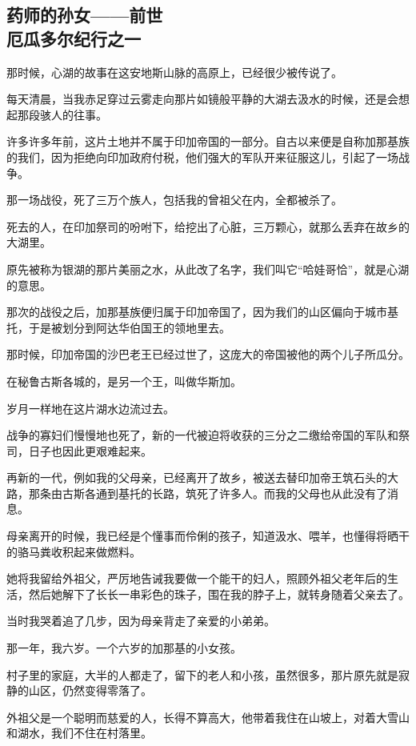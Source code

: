 \subsection{药师的孙女——前世\\\small{厄瓜多尔纪行之一}}
\par 那时候，心湖的故事在这安地斯山脉的高原上，已经很少被传说了。
\par 每天清晨，当我赤足穿过云雾走向那片如镜般平静的大湖去汲水的时候，还是会想起那段骇人的往事。
\par 许多许多年前，这片土地并不属于印加帝国的一部分。自古以来便是自称加那基族的我们，因为拒绝向印加政府付税，他们强大的军队开来征服这儿，引起了一场战争。
\par 那一场战役，死了三万个族人，包括我的曾祖父在内，全都被杀了。
\par 死去的人，在印加祭司的吩咐下，给挖出了心脏，三万颗心，就那么丢弃在故乡的大湖里。
\par 原先被称为银湖的那片美丽之水，从此改了名字，我们叫它“哈娃哥恰”，就是心湖的意思。
\par 那次的战役之后，加那基族便归属于印加帝国了，因为我们的山区偏向于城市基托，于是被划分到阿达华伯国王的领地里去。
\par 那时候，印加帝国的沙巴老王已经过世了，这庞大的帝国被他的两个儿子所瓜分。
\par 在秘鲁古斯各城的，是另一个王，叫做华斯加。
\par 岁月一样地在这片湖水边流过去。
\par 战争的寡妇们慢慢地也死了，新的一代被迫将收获的三分之二缴给帝国的军队和祭司，日子也因此更艰难起来。
\par 再新的一代，例如我的父母亲，已经离开了故乡，被送去替印加帝王筑石头的大路，那条由古斯各通到基托的长路，筑死了许多人。而我的父母也从此没有了消息。
\par 母亲离开的时候，我已经是个懂事而伶俐的孩子，知道汲水、喂羊，也懂得将晒干的骆马粪收积起来做燃料。
\par 她将我留给外祖父，严厉地告诫我要做一个能干的妇人，照顾外祖父老年后的生活，然后她解下了长长一串彩色的珠子，围在我的脖子上，就转身随着父亲去了。
\par 当时我哭着追了几步，因为母亲背走了亲爱的小弟弟。
\par 那一年，我六岁。一个六岁的加那基的小女孩。
\par 村子里的家庭，大半的人都走了，留下的老人和小孩，虽然很多，那片原先就是寂静的山区，仍然变得零落了。
\par 外祖父是一个聪明而慈爱的人，长得不算高大，他带着我住在山坡上，对着大雪山和湖水，我们不住在村落里。
